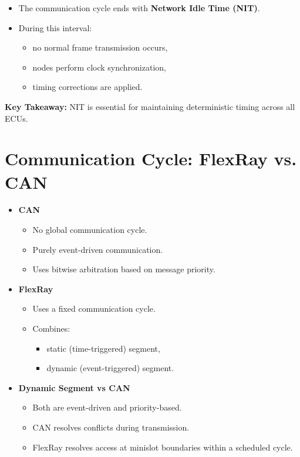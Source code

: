 \begin{itemize}
    \item The communication cycle ends with
    \textbf{Network Idle Time (NIT)}.
    
    \item During this interval:
    \begin{itemize}
        \item no normal frame transmission occurs,
        \item nodes perform clock synchronization,
        \item timing corrections are applied.
    \end{itemize}
\end{itemize}
\begin{mdframed}[backgroundcolor=lightgray, linewidth=0pt, innertopmargin=8pt,
innerbottommargin=8pt]
\textbf{Key Takeaway:}
 NIT is essential for maintaining deterministic timing across all ECUs.
\end{mdframed}

\section{Communication Cycle: FlexRay vs. CAN}
\begin{mdframed}[backgroundcolor=lightgray, linewidth=0pt, innertopmargin=8pt,
innerbottommargin=8pt]
\begin{itemize}
    \item \textbf{CAN}
    \begin{itemize}
        \item No global communication cycle.
        \item Purely event-driven communication.
        \item Uses bitwise arbitration based on message priority.
    \end{itemize}

    \item \textbf{FlexRay}
    \begin{itemize}
        \item Uses a fixed communication cycle.
        \item Combines:
        \begin{itemize}
            \item static (time-triggered) segment,
            \item dynamic (event-triggered) segment.
        \end{itemize}
    \end{itemize}

    \item \textbf{Dynamic Segment vs CAN}
    \begin{itemize}
        \item Both are event-driven and priority-based.
        \item CAN resolves conflicts during transmission.
        \item FlexRay resolves access at minislot boundaries within a scheduled cycle.
    \end{itemize}
\end{itemize}
\end{mdframed}



